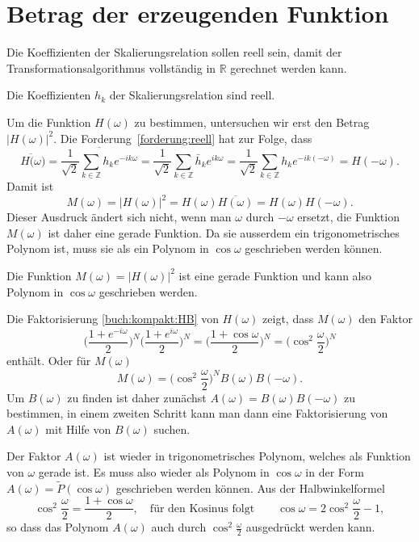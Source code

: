 %
%
%
\section{Betrag der erzeugenden Funktion\label{section:betrag}}
Die Koeffizienten der Skalierungsrelation sollen reell sein, damit
der Transformationsalgorithmus vollständig in $\mathbb R$ gerechnet
werden kann.

\begin{forderung}
\label{forderung:reell}
Die Koeffizienten $h_k$ der Skalierungsrelation sind reell.
\end{forderung}

Um die Funktion $H(\omega)$ zu bestimmen, untersuchen wir erst den
Betrag $|H(\omega)|^2$.
Die Forderung~\ref{forderung:reell} hat zur Folge, dass
\[
\overline{H(\omega})
=
\overline{
\frac1{\sqrt{2}}
\sum_{k\in\mathbb Z} h_ke^{-ik\omega}
}
=
\frac1{\sqrt{2}}
\sum_{k\in\mathbb Z} \bar{h}_ke^{ik\omega}
=
\frac1{\sqrt{2}}
\sum_{k\in\mathbb Z} h_ke^{-ik(-\omega)}
=
H(-\omega).
\]
Damit ist
\[
M(\omega)
=
|H(\omega)|^2
=
H(\omega)
\overline{H(\omega)}
=
H(\omega)H(-\omega).
\]
Dieser Ausdruck ändert sich nicht, wenn man $\omega$ durch $-\omega$
ersetzt, die Funktion $M(\omega)$ ist daher eine gerade Funktion.
Da sie ausserdem ein trigonometrisches Polynom ist, muss sie
als ein Polynom in $\cos\omega$ geschrieben werden können.

\begin{konsequenz}
Die Funktion $M(\omega)=|H(\omega)|^2$ ist eine gerade Funktion
und kann also Polynom in $\cos\omega$ geschrieben werden.
\end{konsequenz}

Die Faktorisierung \eqref{buch:kompakt:HB} von $H(\omega)$
zeigt, dass $M(\omega)$ den Faktor
\[
\biggl(\frac{1+e^{-i\omega}}2\biggr)^N
\biggl(\frac{1+e^{i\omega}}2\biggr)^N
=
\biggl( \frac{1+\cos\omega}2\biggr)^N
=
\biggl(
\cos^2\frac{\omega}2
\biggr)^N
\]
enthält.
Oder für $M(\omega)$
\begin{equation}
M(\omega)
= 
\biggl(
\cos^2\frac{\omega}2
\biggr)^N
B(\omega)B(-\omega).
\label{buch:kompakt:MB}
\end{equation}
Um $B(\omega)$ zu finden ist daher zunächst
$A(\omega)=B(\omega)B(-\omega)$
zu bestimmen, in einem zweiten Schritt kann man dann eine
Faktorisierung von $A(\omega)$ mit Hilfe von $B(\omega)$ suchen.

Der Faktor $A(\omega)$ ist wieder in trigonometrisches Polynom,
welches als Funktion von $\omega$ gerade ist.
Es muss also wieder als Polynom in $\cos\omega$
in der Form $A(\omega)=\tilde{P}(\cos\omega)$
geschrieben werden können.
Aus der Halbwinkelformel
\[
\cos^2\frac{\omega}2
=
\frac{1+\cos\omega}2,
\quad
\text{für den Kosinus folgt}
\qquad
\cos\omega
=
2\cos^2\frac{\omega}2 - 1,
\]
so dass das Polynom $A(\omega)$ auch durch $\cos^2\frac{\omega}2$
ausgedrückt werden kann.

